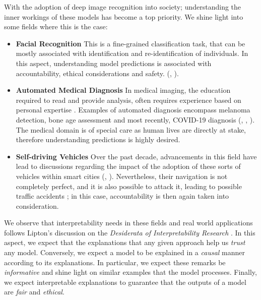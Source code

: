 \noindent With the adoption of deep image recognition into society; understanding the 
inner workings of these models has become a top priority. We shine light into some fields where 
this is the case:
\begin{itemize}
    \item \textbf{Facial Recognition} This  is a fine-grained classification task, 
    that can be mostly associated with identification and re-identification of individuals. 
    In this aspect, understanding model predictions is associated with accountability, ethical 
    considerations and safety.
    (\cite{selinger2020inconsentability}, \cite{andrejevic2020facial}).
    \item \textbf{Automated Medical Diagnosis} In medical imaging, the education 
    required to read and provide analysis, often requires experience based 
    on personal expertise \autocite{nakashima2013visual}. Examples of automated diagnosis encompass 
    melanoma detection, bone age assessment and most recently, COVID-19 diagnosis 
    (\cite{yu2016automated}, \cite{BoNet2019hand}, \cite{huang2021artificial}). The medical domain 
    is of special care as human lives are directly at stake, therefore understanding predictions is 
    highly desired.
    \item \textbf{Self-driving Vehicles} Over the past decade, advancements in this field have lead to 
    discussions regarding the impact of the adoption of these sorts of  vehicles within smart cities  
    (\cite{duarte2018impact}, \cite{millard2018pedestrians}). Nevertheless, their 
    navigation is not completely perfect, and it is also possible to attack it, leading to possible 
    traffic accidents \autocite{dixit2016autonomous}; in this case, accountability is then again 
    taken into consideration.
\end{itemize}
 
\noindent We observe that interpretability needs in these fields and real world applications follows 
Lipton's discussion on the \textit{Desiderata of Interpretability Research} 
\autocite{mythos_interp}. In this aspect, we expect that the explanations that any given 
approach help us \emph{trust} any model. Conversely, we expect a model to be explained in a 
\emph{causal} manner according to its explanations. In particular, 
we expect these remarks be \emph{informative} and shine light on similar examples that the 
model processes. Finally, we expect interpretable explanations to guarantee that the outputs 
of a model are \emph{fair} and \emph{ethical}.

